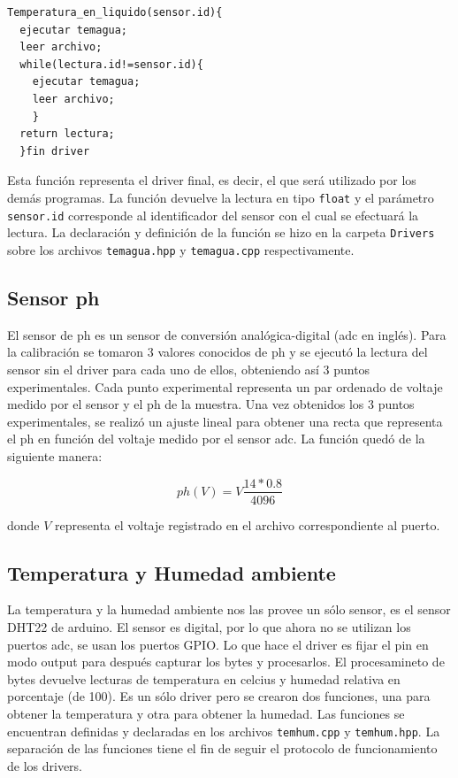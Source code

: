 \documentclass[10pt,twocolumn]{article}
\begin{document}
\begin{verbatim}
Temperatura_en_liquido(sensor.id){
  ejecutar temagua;
  leer archivo;
  while(lectura.id!=sensor.id){
    ejecutar temagua;
    leer archivo;
    }
  return lectura;
  }fin driver
\end{verbatim}

Esta funci\'on representa el driver final, es decir, el que ser\'a utilizado por los dem\'as programas. La funci\'on devuelve la lectura en tipo \verb|float| y el 
par\'ametro 
\verb|sensor.id| 
corresponde al identificador del sensor con el cual se efectuar\'a la 
lectura. La declaraci\'on y definici\'on de la funci\'on se hizo en la carpeta \verb|Drivers| sobre los archivos 
\verb|temagua.hpp| y \verb|temagua.cpp| respectivamente.

\subsection{Sensor ph}
El sensor de ph es un sensor de conversi\'on anal\'ogica-digital (adc en 
ingl\'es). Para la calibraci\'on se tomaron 3 valores conocidos de ph y se ejecut\'o la lectura del sensor sin el driver para cada uno de ellos, obteniendo as\'i 3 puntos 
experimentales. Cada punto experimental representa un par ordenado de voltaje medido por el sensor y el ph de la muestra. Una vez obtenidos los 3 puntos 
experimentales, 
se realiz\'o un ajuste lineal para obtener una recta que 
representa el ph en funci\'on del voltaje medido por el sensor adc. La funci\'on 
qued\'o de la siguiente manera:

\begin{equation}
	ph(V)=V \frac{14*0.8}{4096} 
	\label{ph}
\end{equation}

donde $V$ representa el voltaje registrado 
en el archivo correspondiente al puerto.

\subsection{Temperatura y Humedad ambiente}
La temperatura y la humedad ambiente nos las provee un s\'olo sensor, es el sensor DHT22 de arduino. El sensor es digital, por lo que ahora no se utilizan los puertos adc, 
se usan los puertos GPIO. Lo que hace el driver es fijar el pin en modo output para despu\'es 
capturar los bytes y procesarlos. El procesamineto de bytes devuelve lecturas de temperatura en celcius y humedad relativa en porcentaje (de 100). Es un s\'olo driver 
pero se crearon dos funciones, 
una para obtener la temperatura y otra para obtener la humedad. Las funciones se encuentran definidas y declaradas en los archivos \verb|temhum.cpp| y \verb|temhum.hpp|. La 
separaci\'on de las funciones tiene el 
fin de seguir el protocolo de funcionamiento de los drivers.
\end{document}
